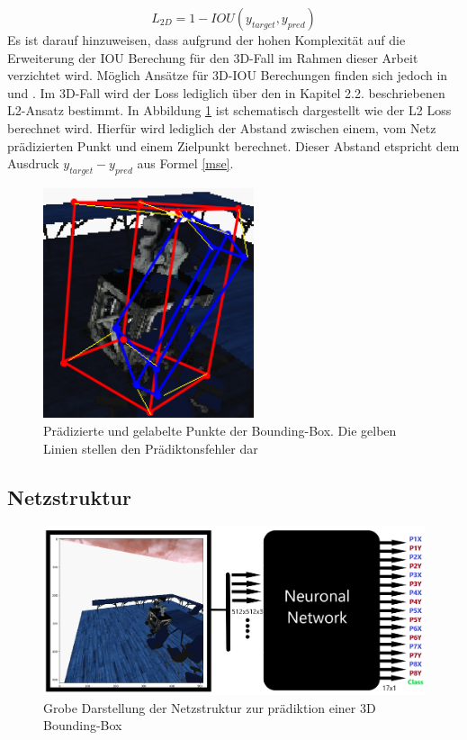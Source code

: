 \begin{equation}\label{iouloss}
	L_{2D}= 1-IOU(y_{target},y_{pred})
\end{equation} 
Es ist darauf hinzuweisen, dass aufgrund der hohen Komplexität auf die Erweiterung der IOU Berechung für den 3D-Fall im Rahmen dieser Arbeit verzichtet wird. Möglich Ansätze für 3D-IOU Berechungen finden sich jedoch in \cite{Xu2019} und \cite{Mousavian1612}. Im 3D-Fall wird der Loss lediglich über den in Kapitel 2.2. beschriebenen L2-Ansatz bestimmt. In Abbildung \ref{L2_loss_graphik} ist schematisch dargestellt wie der L2 Loss berechnet wird. Hierfür wird lediglich der Abstand zwischen einem, vom Netz prädizierten Punkt und einem Zielpunkt berechnet. Dieser Abstand etspricht dem Ausdruck $y_{target}-y_{pred}$ aus Formel \ref{mse}. 
\begin{figure}[!htb]
  \centering
  \includegraphics[width=6.2cm]{Abb/l2_loss_bei3d_bb.png}
  \caption{Prädizierte und gelabelte Punkte der Bounding-Box. Die gelben Linien stellen den Prädiktonsfehler dar}
  \label{L2_loss_graphik}
\end{figure} 
\newpage
\subsection{Netzstruktur}

\begin{figure}[!htb]
  \centering
  \includegraphics[width=13.8cm]{Abb/Modell_struktur.png}
  \caption{Grobe Darstellung der Netzstruktur zur prädiktion einer 3D Bounding-Box}
  \label{grobe_netz_struktur}
\end{figure} 

